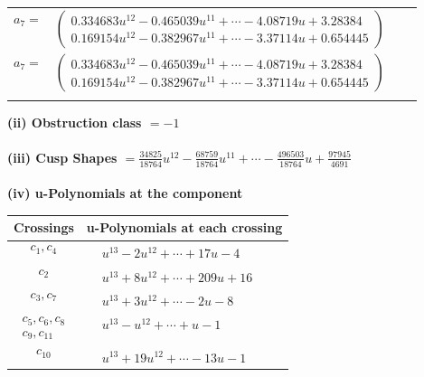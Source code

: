 \documentclass[1p]{elsarticle_modified}
\theoremstyle{definition}
\begin{document}
\begin{tabular}{m{7pt} m{180pt} m{7pt} m{180pt} }
\flushright $a_{7}=$&$\begin{pmatrix}0.334683 u^{12}-0.465039 u^{11}+\cdots-4.08719 u+3.28384\\0.169154 u^{12}-0.382967 u^{11}+\cdots-3.37114 u+0.654445\end{pmatrix}$\\ \flushright $a_{7}=$&$\begin{pmatrix}0.334683 u^{12}-0.465039 u^{11}+\cdots-4.08719 u+3.28384\\0.169154 u^{12}-0.382967 u^{11}+\cdots-3.37114 u+0.654445\end{pmatrix}$\\&\end{tabular}
\flushleft \textbf{(ii) Obstruction class $= -1$}\\~\\
\flushleft \textbf{(iii) Cusp Shapes $= \frac{34825}{18764} u^{12}-\frac{68759}{18764} u^{11}+\cdots-\frac{496503}{18764} u+\frac{97945}{4691}$}\\~\\
\newpage\renewcommand{\arraystretch}{1}
\flushleft \textbf{(iv) u-Polynomials at the component}\newline \\
\begin{tabular}{m{50pt}|m{274pt}}
Crossings & \hspace{64pt}u-Polynomials at each crossing \\
\hline $$\begin{aligned}c_{1},c_{4}\end{aligned}$$&$\begin{aligned}
&u^{13}-2 u^{12}+\cdots+17 u-4
\end{aligned}$\\
\hline $$\begin{aligned}c_{2}\end{aligned}$$&$\begin{aligned}
&u^{13}+8 u^{12}+\cdots+209 u+16
\end{aligned}$\\
\hline $$\begin{aligned}c_{3},c_{7}\end{aligned}$$&$\begin{aligned}
&u^{13}+3 u^{12}+\cdots-2 u-8
\end{aligned}$\\
\hline $$\begin{aligned}c_{5},c_{6},c_{8}\\c_{9},c_{11}\end{aligned}$$&$\begin{aligned}
&u^{13}- u^{12}+\cdots+u-1
\end{aligned}$\\
\hline $$\begin{aligned}c_{10}\end{aligned}$$&$\begin{aligned}
&u^{13}+19 u^{12}+\cdots-13 u-1
\end{aligned}$\\
\hline
\end{tabular}\\~\\
\end{document}
